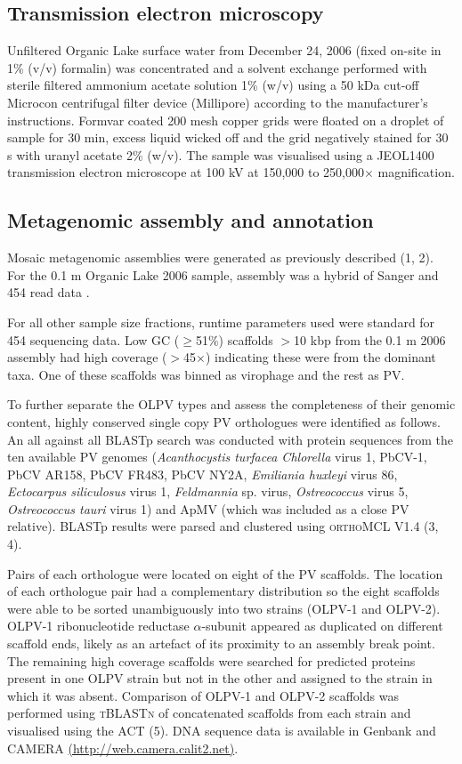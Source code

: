 \subsection{Transmission electron microscopy}
Unfiltered Organic Lake surface water from December 24, 2006 (fixed on-site in 1\% (v/v) formalin) was concentrated and a solvent exchange performed with sterile filtered ammonium acetate solution 1\% (w/v) using a 50 kDa cut-off Microcon centrifugal filter device (Millipore) according to the manufacturer’s instructions. 
Formvar coated 200 mesh copper grids were floated on a droplet of sample for 30 min, excess liquid wicked off and the grid negatively stained for 30 s with uranyl acetate 2\% (w/v). 
The sample was visualised using a \textsc{JEOL1400} transmission electron microscope at 100 kV at 150,000 to 250,000$\times$ magnification.

\subsection{Metagenomic assembly and annotation}
Mosaic metagenomic assemblies were generated as previously described (1, 2). 
For the 0.1 \textmu{}m Organic Lake 2006 sample, assembly was a hybrid of Sanger and 454 read data . 

For all other sample size fractions, runtime parameters used were standard for 454 sequencing data. 
Low GC ($\ge$51\%) scaffolds $>$10 kbp from the 0.1 \textmu{}m 2006 assembly had high coverage ($>$45$\times$) indicating these were from the dominant taxa. 
One of these scaffolds was binned as virophage and the rest as \ac{PV}. 

To further separate the \ac{OLPV} types and assess the completeness of their genomic content, highly conserved single copy PV orthologues were identified as follows. 
An all against all \ac{BLAST}p search was conducted with protein sequences from the ten available \ac{PV} genomes 
(\emph{Acanthocystis turfacea Chlorella} virus 1, PbCV-1, PbCV AR158, PbCV FR483, PbCV NY2A, \emph{Emiliania huxleyi} virus 86, \emph{Ectocarpus siliculosus} virus 1, \emph{Feldmannia} sp. virus, \emph{Ostreococcus} virus 5, \emph{Ostreococcus tauri} virus 1) and \ac{ApMV} (which was included as a close \ac{PV} relative). 
\ac{BLAST}p results were parsed and clustered using \textsc{orthoMCL} V1.4 (3, 4). 

Pairs of each orthologue were located on eight of the \ac{PV} scaffolds. 
The location of each orthologue pair had a complementary distribution so the eight scaffolds were able to be sorted unambiguously into two strains (\ac{OLPV}-1 and \ac{OLPV}-2). 
\ac{OLPV}-1 ribonucleotide reductase $\alpha$-subunit appeared as duplicated on different scaffold ends, likely as an artefact of its proximity to an assembly break point. 
The remaining high coverage scaffolds were searched for predicted proteins present in one \ac{OLPV} strain but not in the other and assigned to the strain in which it was absent. 
Comparison of \ac{OLPV}-1 and \ac{OLPV}-2 scaffolds was performed using \textsc{tBLASTn} of concatenated scaffolds from each strain and visualised using the \ac{ACT} (5). 
\textsc{DNA} sequence data is available in Genbank and \ac{CAMERA} \url{(http://web.camera.calit2.net)}.

